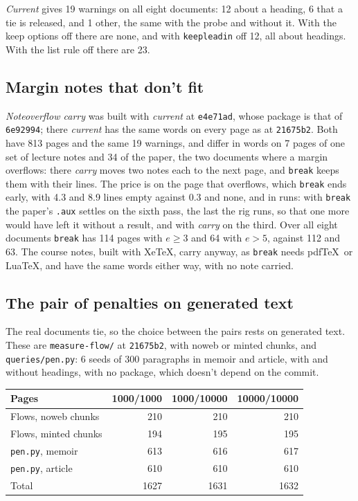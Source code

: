 \emph{Current} gives 19 warnings on all eight documents: 12 about a heading, 6 that a tie is
released, and 1 other, the same with the probe and without it.
With the keep options off there are none, and with \texttt{keepleadin} off 12, all about headings.
With the list rule off there are 23.

\subsection{Margin notes that don't fit}

\emph{Noteoverflow carry} was built with \emph{current} at \texttt{e4e71ad}, whose package is that
of \texttt{6e92994}; there \emph{current} has the same words on every page as at \texttt{21675b2}.
Both have 813 pages and the same 19 warnings, and differ in words on 7 pages of one set of lecture
notes and 34 of the paper, the two documents where a margin overflows: there \emph{carry} moves two
notes each to the next page, and \texttt{break} keeps them with their lines.
The price is on the page that overflows, which \texttt{break} ends early, with 4.3 and 8.9 lines
empty against 0.3 and none, and in runs: with \texttt{break} the paper's \texttt{.aux} settles on the
sixth pass, the last the rig runs, so that one more would have left it without a result, and with
\emph{carry} on the third.
Over all eight documents \texttt{break} has 114 pages with $e\ge3$ and 64 with $e>5$, against 112
and 63.
The course notes, built with Xe\TeX, carry anyway, as \texttt{break} needs pdf\TeX\ or Lua\TeX, and
have the same words either way, with no note carried.

\subsection{The pair of penalties on generated text}

The real documents tie, so the choice between the pairs rests on generated text.
These are \texttt{measure-flow/} at \texttt{21675b2}, with \textsf{noweb} or \textsf{minted} chunks,
and \texttt{queries/pen.py}: 6 seeds of 300 paragraphs in \textsf{memoir} and \textsf{article}, with
and without headings, with no package, which doesn't depend on the commit.

\begin{center}\small
\begin{tabular}{@{}lrrr@{}}
\toprule
Pages & 1000/1000 & 1000/10000 & 10000/10000 \\
\midrule
Flows, \textsf{noweb} chunks & 210 & 210 & 210 \\
Flows, \textsf{minted} chunks & 194 & 195 & 195 \\
\texttt{pen.py}, \textsf{memoir} & 613 & 616 & 617 \\
\texttt{pen.py}, \textsf{article} & 610 & 610 & 610 \\
\midrule
Total & 1627 & 1631 & 1632 \\
\bottomrule
\end{tabular}
\end{center}

